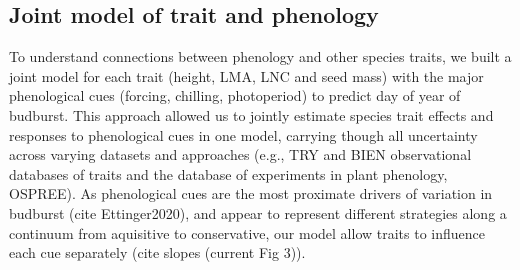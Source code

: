 \documentclass[11pt]{article}
\begin{document}

\renewcommand{\refname}{\CHead{}}

\subsection*{Joint model of trait and phenology}
To understand connections between phenology and other species traits, we built a joint model for each trait (height, LMA, LNC and seed mass) with the major phenological cues (forcing, chilling, photoperiod) to predict day of year of budburst. This approach allowed us to jointly estimate species trait effects and responses to phenological cues in one model, carrying though all uncertainty across varying datasets and approaches (e.g., TRY and BIEN observational databases of traits and the database of experiments in plant phenology, OSPREE). As phenological cues are the most proximate drivers of variation in budburst (cite Ettinger2020), and appear to represent different strategies along a continuum from aquisitive to conservative, our model allow traits to influence each cue separately (cite slopes (current Fig 3)). \\
\end{document}
